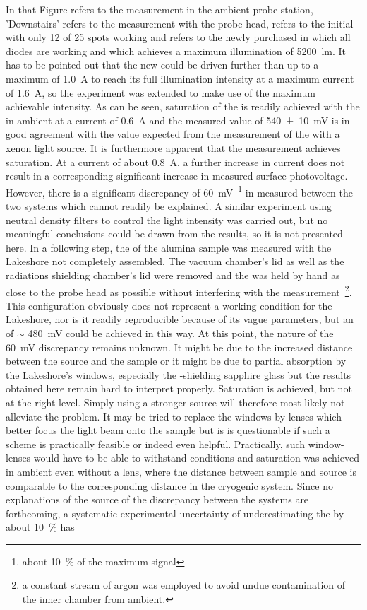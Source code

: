 In that Figure  refers to the measurement in the ambient probe station, 'Downstairs' refers to the measurement with the \McA{} probe head,  refers to the initial \led{} with only 12 of 25 spots working and  refers to the newly purchased \led{} in which all diodes are working and which achieves a maximum illumination of \SI{5200}{\lumen}. It has to be pointed out that the new \led{} could be driven further than up to a maximum of \SI{1.0}{\ampere} to reach its full illumination intensity at a maximum current of \SI{1.6}{\ampere}, so the experiment was extended to make use of the maximum achievable intensity. As can be seen, saturation of the \spv{} is readily achieved with the \led{} in ambient at a current of \SI{0.6}{\ampere} and the measured value of \SI{540+-10}{\milli\volt} is in good agreement with the value expected from the measurement of the \spv{} with a xenon light source. It is furthermore apparent that the measurement achieves saturation. At a current of about \SI{0.8}{\ampere}, a further increase in current does not result in a corresponding significant increase in measured surface photovoltage. However, there is a significant discrepancy of \SI{60}{\milli\volt}~\footnote{about \SI{10}{\percent} of the maximum signal} in measured \spv{} between the two systems which cannot readily be explained. A similar experiment using neutral density filters to control the light intensity was carried out, but no meaningful conclusions could be drawn from the results, so it is not presented here. In a following step, the \spv{} of the alumina sample was measured with the Lakeshore not completely assembled. The vacuum chamber's lid as well as the radiations shielding chamber's lid were removed and the \led{} was held by hand as close to the probe head as possible without interfering with the measurement~\footnote{a constant stream of argon was employed to avoid undue contamination of the inner chamber from ambient.}. This configuration obviously does not represent a working condition for the Lakeshore, nor is it readily reproducible because of its vague parameters, but an \spv{} of $\sim$ \SI{480}{\milli\volt} could be achieved in this way. At this point, the nature of the \SI{60}{\milli\volt} discrepancy remains unknown. It might be due to the increased distance between the source and the sample or it might be due to partial absorption by the Lakeshore's windows, especially the \ir{}-shielding sapphire glass but the results obtained here remain hard to interpret properly. Saturation is achieved, but not at the right level. Simply using a stronger source will therefore most likely not alleviate the problem. It may be tried to replace the windows by lenses which better focus the light beam onto the sample but is is questionable if such a scheme is practically feasible or indeed even helpful. Practically, such window-lenses would have to be able to withstand \uhv{} conditions and saturation was achieved in ambient even without a lens, where the distance between sample and source is comparable to the corresponding distance in the cryogenic system. Since no explanations of the source of the discrepancy between the systems are forthcoming, a systematic experimental uncertainty of underestimating the \spv{} by about \SI{10}{\percent} has 